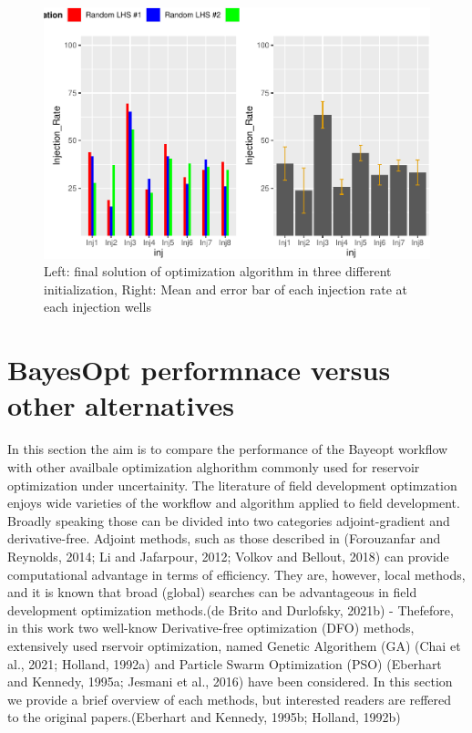 \documentclass[]{elsarticle} %
\begin{document}
\begin{figure}

{\centering \includegraphics[width=0.9\linewidth]{0_Paper1_main_files/figure-latex/diffu-1} 

}

\caption{Left: final solution of optimization algorithm in three different initialization, Right: Mean and error bar of each injection rate at each injection wells}\label{fig:diffu}
\end{figure}

\newpage

\newpage

\hypertarget{bayesopt-performnace-versus-other-alternatives}{%
\section{BayesOpt performnace versus other alternatives}\label{bayesopt-performnace-versus-other-alternatives}}

In this section the aim is to compare the performance of the Bayeopt workflow with other availbale optimization alghorithm commonly used for reservoir optimization under uncertainity. The literature of field development optimzation enjoys wide varieties of the workflow and algorithm applied to field development. Broadly speaking those can be divided into two categories adjoint-gradient and derivative-free. Adjoint methods, such as those described in (Forouzanfar and Reynolds, 2014; Li and Jafarpour, 2012; Volkov and Bellout, 2018) can provide computational advantage in terms of efficiency. They are, however, local methods, and it is known that broad (global) searches can be advantageous in field development optimization methods.(de Brito and Durlofsky, 2021b) - Thefefore, in this work two well-know Derivative-free optimization (DFO) methods, extensively used rservoir optimization, named Genetic Algorithem (GA) (Chai et al., 2021; Holland, 1992a) and Particle Swarm Optimization (PSO) (Eberhart and Kennedy, 1995a; Jesmani et al., 2016) have been considered. In this section we provide a brief overview of each methods, but interested readers are reffered to the original papers.(Eberhart and Kennedy, 1995b; Holland, 1992b)
\end{document}

